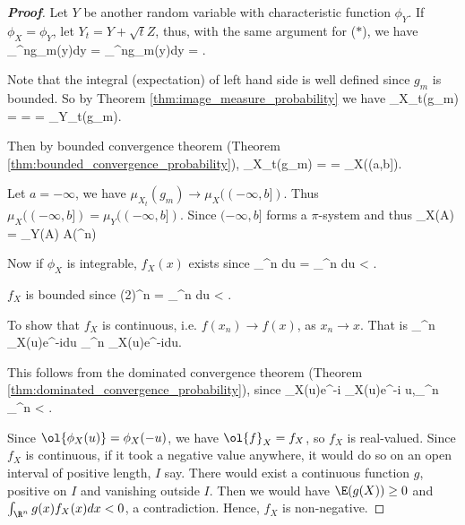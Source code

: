 \begin{proof}[\bf Proof]
Let $Y$ be another random variable with characteristic function $\phi_Y$. If $\phi_X = \phi_Y$, let $Y_t = Y + \sqrt{t}Z$, thus, with the same argument for ($*$), we have
\beast
\int_{\R^n}g_m(y)dy = \int_{\R^n}g_m(y)dy = \E{}.
\eeast

Note that the integral (expectation) of left hand side is well defined since $g_m$ is bounded. So by Theorem \ref{thm:image_measure_probability} we have
\be
\mu_{X_t}(g_m) = \E{} = \E{} = \mu_{Y_t}(g_m).
\ee

Then by bounded convergence theorem (Theorem \ref{thm:bounded_convergence_probability}),
\be
\mu_{X_t}(g_m) = \E {} \to \E{} \to \E{} = \mu_X((a,b]). \quad\quad {}
\ee

Let $a=-\infty$, we have $\mu_{X_t}(g_m) \to \mu_X((-\infty,b])$. Thus $\mu_X((-\infty,b]) = \mu_Y((-\infty,b])$. Since $(-\infty,b]$ forms a $\pi$-system and thus
\be
\mu_X(A) = \mu_Y(A) \quad \forall A\in \sB(\R^n)\quad\ra\quad{}
\ee

Now if $\phi_X$ is integrable, $f_X(x)$ exists since
\be
\int_{\R^n}  du = \int_{\R^n} du < \infty.
\ee

$f_X$ is bounded since
\be
(2\pi)^n  =  \leq \int_{\R^n} du < \infty.
\ee

To show that $f_X$ is continuous, i.e. $f(x_n)\to f(x)$, as $x_n\to x$. That is
\be
{} \int_{\R^n} \phi_X(u)e^{-i}du \to {} \int_{\R^n} \phi_X(u)e^{-i}du.
\ee

This follows from the dominated convergence theorem (Theorem \ref{thm:dominated_convergence_probability}), since
\be
\phi_X(u)e^{-i} \to \phi_X(u)e^{-i} \quad \quad {}u\in \R,\quad\quad{}\quad \int_{\R^n}  \leq \int_{\R^n}  < \infty.
\ee

Since $\ol{\phi_X(u)} = \phi_X(-u)$, we have $\ol{f}_X = f_X$, so $f_X$ is real-valued. Since $f_X$ is continuous, if it took a negative value anywhere, it would do so on an open interval of positive length, $I$ say. There would exist a continuous function $g$, positive on $I$ and vanishing outside $I$. Then we would have $\E(g(X)) \geq 0$ and $\int_{\R^n} g(x)f_X(x)dx < 0$, a contradiction. Hence, $f_X$ is non-negative.


\end{proof}
